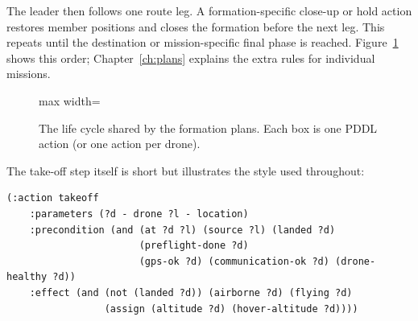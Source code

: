 \documentclass[11pt,a4paper,oneside]{report}
\begin{document}
The leader then follows one route leg. A formation-specific close-up or hold
action restores member positions and closes the formation before the next leg.
This repeats until the destination or mission-specific final phase is reached.
Figure~\ref{fig:lifecycle} shows this order; Chapter~\ref{ch:plans} explains the
extra rules for individual missions.

\begin{figure}[H]
\centering
\begin{adjustbox}{max width=\linewidth}
\end{adjustbox}
\caption[Common mission life cycle]{The life cycle shared by the formation plans. Each box is one PDDL action (or one
action per drone).}
\label{fig:lifecycle}
\end{figure}

The take-off step itself is short but illustrates the style used throughout:

\begin{lstlisting}
(:action takeoff
    :parameters (?d - drone ?l - location)
    :precondition (and (at ?d ?l) (source ?l) (landed ?d)
                       (preflight-done ?d)
                       (gps-ok ?d) (communication-ok ?d) (drone-healthy ?d))
    :effect (and (not (landed ?d)) (airborne ?d) (flying ?d)
                 (assign (altitude ?d) (hover-altitude ?d))))
\end{lstlisting}
\end{document}
